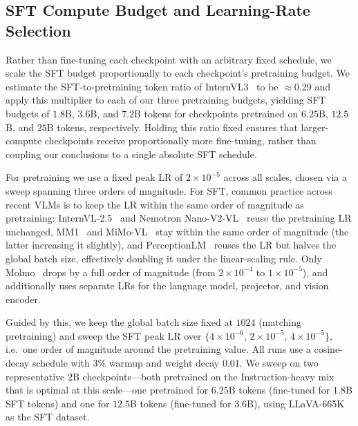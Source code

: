 \subsection{SFT Compute Budget and Learning-Rate Selection}\label{app:sft-hparams}

 Rather than fine-tuning each checkpoint with an arbitrary fixed schedule, we scale the SFT budget proportionally to each checkpoint's pretraining budget. We estimate the SFT-to-pretraining token ratio of InternVL3~\citep{zhu2025internvl3} to be $\approx\!0.29$ and apply this multiplier to each of our three pretraining budgets, yielding SFT budgets of $1.8$B, $3.6$B, and $7.2$B tokens for checkpoints pretrained on $6.25$B, $12.5$B, and $25$B tokens, respectively. Holding this ratio fixed ensures that larger-compute checkpoints receive proportionally more fine-tuning, rather than coupling our conclusions to a single absolute SFT schedule.

 For pretraining we use a fixed peak LR of $2\times10^{-5}$ across all scales, chosen via a sweep spanning three orders of magnitude. For SFT, common practice across recent VLMs is to keep the LR within the same order of magnitude as pretraining: InternVL-2.5~\citep{chen2024expanding} and Nemotron Nano-V2-VL~\citep{deshmukh2025nvidia} reuse the pretraining LR unchanged, MM1~\citep{mckinzie2024mm1} and MiMo-VL~\citep{coreteam2025mimovltechnicalreport} stay within the same order of magnitude (the latter increasing it slightly), and PerceptionLM~\citep{cho2025perceptionlm} reuses the LR but halves the global batch size, effectively doubling it under the linear-scaling rule. Only Molmo~\citep{deitke2025molmo} drops by a full order of magnitude (from $2\times10^{-4}$ to $1\times10^{-5}$), and additionally uses separate LRs for the language model, projector, and vision encoder.

 Guided by this, we keep the global batch size fixed at $1024$ (matching pretraining) and sweep the SFT peak LR over $\{4\times10^{-6},\, 2\times10^{-5},\, 4\times10^{-5}\}$, i.e.\ one order of magnitude around the pretraining value. All runs use a cosine-decay schedule with $3\%$ warmup and weight decay $0.01$. We sweep on two representative $2$B checkpoints---both pretrained on the Instruction-heavy mix that is optimal at this scale---one pretrained for $6.25$B tokens (fine-tuned for $1.8$B SFT tokens) and one for $12.5$B tokens (fine-tuned for $3.6$B), using LLaVA-665K~\citep{liu2023visual} as the SFT dataset.

